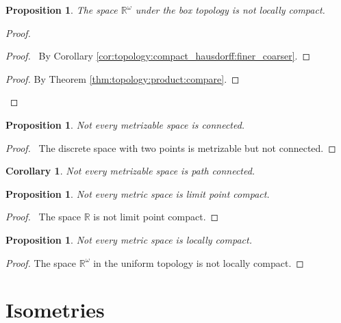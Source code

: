 \documentclass{report}
\let\qed\relax
\newtheorem{prop}[lm]{Proposition}
\newtheorem{cor}{Corollary}[lm]
\theoremstyle{definition}
\begin{document}
 \begin{prop}
 	The space $\mathbb{R}^\omega$ under the box topology is not locally compact.
 \end{prop}

 \begin{proof}
 	\pf
 	\begin{proof}
 		\pf\ By Corollary \ref{cor:topology:compact_hausdorff:finer_coarser}.
 	\end{proof}
 	\begin{proof}
 		\pf By Theorem \ref{thm:topology:product:compare}.
 	\end{proof}
 	\qed
 \end{proof}

 \begin{prop}
 Not every metrizable space is connected.
\end{prop}

\begin{proof}
 \pf\ The discrete space with two points is metrizable but not connected. \qed
\end{proof}

\begin{cor}
 Not every metrizable space is path connected.
\end{cor}

\begin{prop}
  Not every metric space is limit point compact.
\end{prop}

\begin{proof}
  \pf\ The space $\mathbb{R}$ is not limit point compact. \qed
\end{proof}

\begin{prop}
  Not every metric space is locally compact.
\end{prop}

\begin{proof}
  The space $\mathbb{R}^\omega$ in the uniform topology is not locally compact.
\end{proof}

  \section{Isometries}
\end{document}
